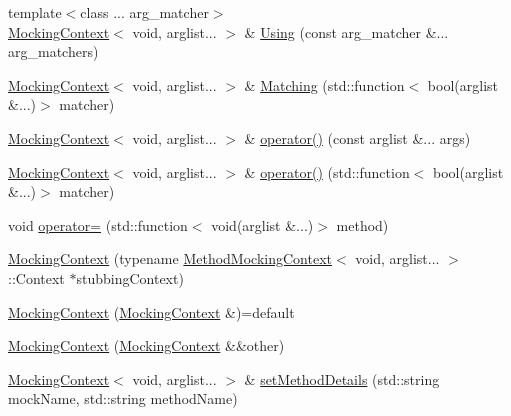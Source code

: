 \begin{DoxyCompactItemize}
\item 
{\footnotesize template$<$class ... arg\+\_\+matcher$>$ }\\\mbox{\hyperlink{classfakeit_1_1MockingContext}{Mocking\+Context}}$<$ void, arglist... $>$ \& \mbox{\hyperlink{classfakeit_1_1MockingContext_3_01void_00_01arglist_8_8_8_01_4_aaab0ad3883ab87bd3885671e3266546e}{Using}} (const arg\+\_\+matcher \&... arg\+\_\+matchers)
\item 
\mbox{\hyperlink{classfakeit_1_1MockingContext}{Mocking\+Context}}$<$ void, arglist... $>$ \& \mbox{\hyperlink{classfakeit_1_1MockingContext_3_01void_00_01arglist_8_8_8_01_4_a28152fc4e0105f5e6424515367a5d4c3}{Matching}} (std\+::function$<$ bool(arglist \&...)$>$ matcher)
\item 
\mbox{\hyperlink{classfakeit_1_1MockingContext}{Mocking\+Context}}$<$ void, arglist... $>$ \& \mbox{\hyperlink{classfakeit_1_1MockingContext_3_01void_00_01arglist_8_8_8_01_4_a73476d376f7ec5631ba9a37ff5264599}{operator()}} (const arglist \&... args)
\item 
\mbox{\hyperlink{classfakeit_1_1MockingContext}{Mocking\+Context}}$<$ void, arglist... $>$ \& \mbox{\hyperlink{classfakeit_1_1MockingContext_3_01void_00_01arglist_8_8_8_01_4_a1a5a55569a763877d395635979e6b3d6}{operator()}} (std\+::function$<$ bool(arglist \&...)$>$ matcher)
\item 
void \mbox{\hyperlink{classfakeit_1_1MockingContext_3_01void_00_01arglist_8_8_8_01_4_a86584df9e9a7a73b078ad68fa5893d50}{operator=}} (std\+::function$<$ void(arglist \&...)$>$ method)
\item 
\mbox{\hyperlink{classfakeit_1_1MockingContext_3_01void_00_01arglist_8_8_8_01_4_a655f7e31674dfb282f30a94f31ffd2a7}{Mocking\+Context}} (typename \mbox{\hyperlink{classfakeit_1_1MethodMockingContext}{Method\+Mocking\+Context}}$<$ void, arglist... $>$\+::Context $\ast$stubbing\+Context)
\item 
\mbox{\hyperlink{classfakeit_1_1MockingContext_3_01void_00_01arglist_8_8_8_01_4_a750dcc8fb80a9931c41143ce73d7177c}{Mocking\+Context}} (\mbox{\hyperlink{classfakeit_1_1MockingContext}{Mocking\+Context}} \&)=default
\item 
\mbox{\hyperlink{classfakeit_1_1MockingContext_3_01void_00_01arglist_8_8_8_01_4_a1f7b3663809191b919290f0db05d59f1}{Mocking\+Context}} (\mbox{\hyperlink{classfakeit_1_1MockingContext}{Mocking\+Context}} \&\&other)
\item 
\mbox{\hyperlink{classfakeit_1_1MockingContext}{Mocking\+Context}}$<$ void, arglist... $>$ \& \mbox{\hyperlink{classfakeit_1_1MockingContext_3_01void_00_01arglist_8_8_8_01_4_a5479ea5b1a1f32898cc9592bfb1c7777}{set\+Method\+Details}} (std\+::string mock\+Name, std\+::string method\+Name)

\end{DoxyCompactItemize}

